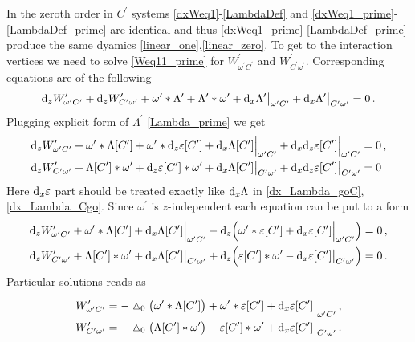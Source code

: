 \documentclass[12pt]{article}
\newcommand{\dr}{{{\rm d}}}
\newcommand{\go}{\omega}
\newcommand{\hmt}{\vartriangle}
\begin{document}
In the zeroth order in $C^\prime$ systems \eqref{dxWeq1}-\eqref{LambdaDef} and \eqref{dxWeq1_prime}-\eqref{LambdaDef_prime} are identical and thus \eqref{dxWeq1_prime}-\eqref{LambdaDef_prime} produce the same dyamics \eqref{linear_one},\eqref{linear_zero}. To get to the interaction vertices we need to solve \eqref{Weq11_prime} for $W^\prime_{\go^\prime C^\prime}$ and $W^\prime_{C^\prime \go^\prime}$. Corresponding equations are of the following
\begin{equation}\label{dzWwC_prime}
\dr_zW^\prime_{\go^\prime C^\prime}+\dr_z W^\prime_{C^\prime\go^\prime}+\go^\prime\ast \Lambda^\prime+\Lambda^\prime\ast \go^\prime+\dr_x\Lambda^\prime\big|_{\go^\prime C^\prime}+\dr_x\Lambda^\prime\big|_{C^\prime\go^\prime}=0\,.\\
\end{equation}
Plugging explicit form of $\Lambda^\prime$ \eqref{Lambda_prime} we get
\begin{align}
& \dr_z W^\prime_{\go^\prime C^\prime}+\omega^\prime\ast \Lambda[C^\prime]+\omega^\prime\ast \dr_z \varepsilon[C^\prime]+\dr_x\Lambda[C^\prime]\Big|_{\go^\prime C^\prime}+\dr_x\dr_z \varepsilon[C^\prime]\Big|_{\go^\prime C^\prime}=0\,,\\
& \dr_z W^\prime_{C^\prime \go^\prime}+\Lambda[C^\prime]\ast \go^\prime+\dr_z \varepsilon[C^\prime]\ast \go^\prime+\dr_x\Lambda[C^\prime]\big|_{C^\prime \go^\prime}+\dr_x\dr_z \varepsilon[C^\prime]\big|_{C^\prime\go^\prime }=0
\end{align}
Here $\dr_x \varepsilon$ part should be treated exactly like $\dr_x \Lambda$ in \eqref{dx_Lambda_goC},\eqref{dx_Lambda_Cgo}. Since $\omega^\prime$ is $z$-independent each equation can be put to a form
\begin{align}
& \dr_z W^\prime_{\go^\prime C^\prime}+\omega^\prime\ast \Lambda[C^\prime]+\dr_x\Lambda[C^\prime]\Big|_{\go^\prime C^\prime}-\dr_z\Big(\omega^\prime\ast \varepsilon[C^\prime]+\dr_x \varepsilon[C^\prime]\Big|_{\go^\prime C^\prime}\Big)=0\,,\label{eq1}\\
& \dr_z W^\prime_{C^\prime \go^\prime}+\Lambda[C^\prime]\ast \go^\prime+\dr_x\Lambda[C^\prime]\big|_{C^\prime \go^\prime}+\dr_z\Big( \varepsilon[C^\prime]\ast \go^\prime-\dr_x \varepsilon[C^\prime]\big|_{C^\prime\go^\prime }\Big)=0\label{eq2}\,.
\end{align} 
Particular solutions reads as
\begin{align}
& W^\prime_{\go^\prime C^\prime }=-\hmt_0\big(\go^\prime \ast \Lambda[C^\prime]\big)+\omega^\prime\ast \varepsilon[C^\prime]+\dr_x \varepsilon[C^\prime]\Big|_{\go^\prime C^\prime}\,,\label{W_prime_goC}\\
& W^\prime_{C^\prime\go^\prime}=-\hmt_0\big(\Lambda[C^\prime]\ast \go^\prime\big)-\varepsilon[C^\prime]\ast \go^\prime+\dr_x \varepsilon[C^\prime]\big|_{C^\prime\go^\prime }\, \label{W_prime_Cgo}.
\end{align}
\end{document}
